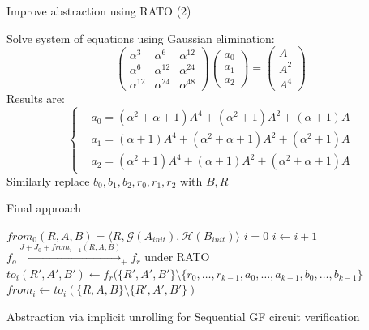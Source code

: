 \documentclass[xcolor=dvipsnames]{beamer}
\begin{document}
\begin{frame}{\large{Improve abstraction using RATO (2)}}
\begin{Example}
Solve system of equations using Gaussian elimination:
\begin{displaymath}
\begin{pmatrix}
\alpha^3 & \alpha^6 & \alpha^{12}\\
\alpha^6 & \alpha^{12} & \alpha^{24} \\
\alpha^{12} & \alpha^{24} & \alpha^{48}
\end{pmatrix}
\begin{pmatrix}
a_0\\
a_1\\
a_2
\end{pmatrix}
=
\begin{pmatrix}
A\\
A^2\\
A^4
\end{pmatrix}
\end{displaymath}
Results are:
\begin{displaymath}
\left\{
\begin{aligned}
&a_0 = (\alpha^2+\alpha+1)A^4+(\alpha^2+1)A^2+(\alpha+1)A \\
&a_1 = (\alpha+1) A^4+(\alpha^2+\alpha+1) A^2+(\alpha^2+1) A\\
&a_2 = (\alpha^2+1) A^4+(\alpha+1) A^2+(\alpha^2+\alpha+1) A
\end{aligned}
\right.
\end{displaymath}
Similarly replace $b_0,b_1,b_2,r_0,r_1,r_2$ with $B,R$
\end{Example}
\end{frame}

\begin{frame}{\large{Final approach}}
\begin{algorithm}[H] %
\SetAlgoNoLine

  $from_0(R,A,B) = \langle R, \mathcal{G}(A_{init}), \mathcal{H}(B_{init})\rangle$\;
  $i = 0$\;
  {
  	$i \gets i + 1$\;
	\alert{$f_o \xrightarrow{J + J_0+ from_{i-1}(R,A,B)}_+ f_r$ under RATO} \;
	\alert{$to_i(R',A',B')\gets f_r(\{R',A',B'\}\setminus\{r_0,\dots,r_{k-1},a_0,\dots,a_{k-1},b_0,\dots,b_{k-1}\}$}\;
	$from_i \gets to_i(\{R,A,B\}\setminus \{R',A',B'\})$\;
  }
\caption {Abstraction via implicit unrolling for Sequential GF circuit verification}
\end{algorithm}
\end{frame}
\end{document}
